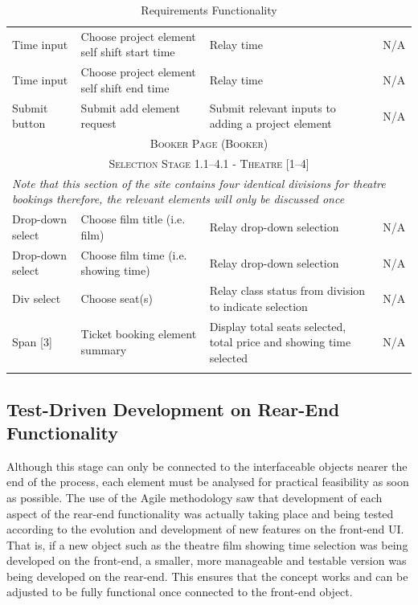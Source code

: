 \documentclass[11pt, english]{article}
\begin{document}
\begin{center}
\begin{longtable}{p{3cm}p{3cm}p{4cm}p{3cm}}
		Time input & Choose project element self shift start time & Relay time & N/A\\
		Time input & Choose project element self shift end time & Relay time & N/A\\
		Submit button & Submit add element request & Submit relevant inputs to adding a project element & N/A\\
		\hline
		\hline
		\multicolumn{4}{c}{\textsc{Booker Page (Booker)}}\\
		\hline
		\hline
		\multicolumn{4}{c}{\textsc{Selection Stage 1.1--4.1 - Theatre [1--4]}}\\
		\hline
		\multicolumn{4}{p{13cm}}{\textit{Note that this section of the site contains four identical divisions for theatre bookings therefore, the relevant elements will only be discussed once}}\\
		\hline
		Drop-down select & Choose film title (i.e. film) & Relay drop-down selection & N/A\\
		Drop-down select & Choose film time (i.e. showing time) & Relay drop-down selection & N/A\\
		Div select & Choose seat(s) & Relay class status from division to indicate selection & N/A\\
		Span [3] & Ticket booking element summary & Display total seats selected, total price and showing time selected & N/A\\
		\hline
		\caption{Requirements Functionality}
	\end{longtable}
	\end{center}

	\subsection{Test-Driven Development on Rear-End Functionality}

	Although this stage can only be connected to the interfaceable objects nearer the end of the process, each element must be analysed for practical feasibility as soon as possible. The use of the Agile methodology saw that development of each aspect of the rear-end functionality was actually taking place and being tested according to the evolution and development of new features on the front-end UI. That is, if a new object such as the theatre film showing time selection was being developed on the front-end, a smaller, more manageable and testable version was being developed on the rear-end. This ensures that the concept works and can be adjusted to be fully functional once connected to the front-end object.
\end{document}
